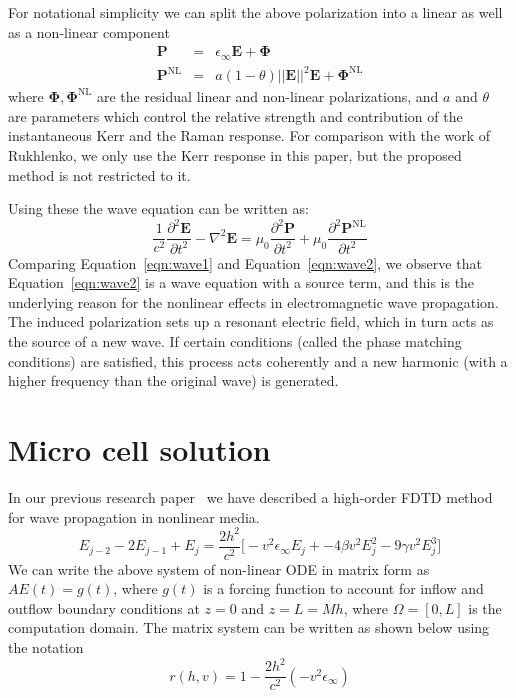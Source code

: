 \documentclass{article}[12pt]
\theoremstyle{plain}
\begin{document}
For notational simplicity we can split the above polarization into a linear as well
as a non-linear component
\begin{eqnarray}
  \mathbf{P} & = & \epsilon_\infty \mathbf{E} + \mathbf{\Phi} \\
  \mathbf{P^\mathrm{NL}} & = & a(1-\theta)||\mathbf{E}||^2\mathbf{E} + \mathbf{\Phi}^\mathrm{NL}
\end{eqnarray}
where $\mathbf{\Phi},\mathbf{\Phi}^\mathrm{NL}$ are the residual linear and non-linear
polarizations, and $a$ and $\theta$ are parameters which control the relative
strength and contribution of the instantaneous Kerr and the Raman response.
For comparison with the work of Rukhlenko, we only use the Kerr response in this
paper, but the proposed method is not restricted to it.

Using these the wave equation can be written as:
\begin{equation}
  \frac{1}{c^2} \frac{\partial^2 \mathbf{E}}{\partial t^2} - \nabla^2\mathbf{E} =
  \mu_0 \frac{\partial^2 \mathbf{P}}{\partial t^2} + \mu_0 \frac{\partial^2 \mathbf{P}^\mathrm{NL}}{\partial t^2}
  \label{eqn:wave2}
\end{equation}
Comparing Equation~\ref{eqn:wave1} and Equation~\ref{eqn:wave2}, we observe that
Equation~\ref{eqn:wave2} is a wave equation with a source term, and this is the underlying
reason for the nonlinear effects in electromagnetic wave propagation. The induced polarization
sets up a resonant electric field, which in turn acts as the source of a new wave. If certain
conditions (called the phase matching conditions) are satisfied, this process acts coherently
and a new harmonic (with a higher frequency than the original wave) is generated.


\section{Micro cell solution}
\label{section:micro-cell}
In our previous research paper~\cite{koranne_optics} we have described a high-order FDTD method for
wave propagation in nonlinear media.
\begin{equation}
E_{j-2} - 2E_{j-1} + E_{j}  = \frac{2h^2}{c^2}\Big[-v^2\epsilon_\infty E_j + - 4\beta v^2 E_j^2 - 9\gamma v^2 E_j^3\Big]
\end{equation}
We can write the above system of non-linear ODE in matrix form as $AE(t)=g(t)$, where $g(t)$ is a forcing function to account
for inflow and outflow boundary conditions at $z=0$ and $z=L=Mh$, where $\Omega=[0,L]$ is the computation domain. The matrix
system can be written as shown below using the notation
\begin{equation}
r(h,v) = 1-\frac{2h^2}{c^2}(-v^2\epsilon_\infty ) \label{eqn:rhv}
\end{equation}
\end{document}
